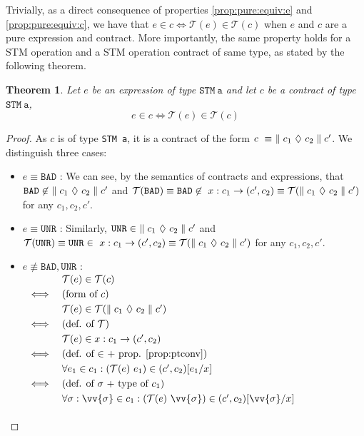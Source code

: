 \documentclass[submission,copyright,creativecommons]{eptcs}
\newcommand{\pt}{\ensuremath{\mathcal{T}}}
\newtheorem{theorem}{Theorem}
\begin{document}
Trivially, as a direct consequence of properties \eqref{prop:pure:equiv:e} and \eqref{prop:pure:equiv:c}, we have that $e \in c \iff \pt(e) \in \pt(c)$ when $e$ and $c$ are a pure expression and contract. 
More importantly, the same property holds for a STM operation and a STM operation contract of same type, as stated by the following theorem.
\begin{theorem}
Let $e$ be an expression of type $\mathtt{STM \ a}$ and let $c$ be a contract of type $\mathtt{STM \ a}$, 
\[ e \in c \iff \pt(e) \in \pt(c) \]
\end{theorem}
\begin{proof}
As $c$ is of type \texttt{STM a}, it is a contract of the form $c \ \equiv \ \parallel c_1 \ \lozenge \ c_2 \parallel c'$. We distinguish three cases:
\begin{itemize}
\item $e \equiv \mathtt{BAD}$ : 
We can see, by the semantics of contracts and expressions, that $\mathtt{BAD} \not\in \ \contractTM{c_1}{c_2}{c'}$ and $\pt(\mathtt{BAD}) \equiv \mathtt{BAD} \not\in \ x : c_1 -> (c',c_2) \equiv \pt(\contractTM{c_1}{c_2}{c'}) $ for any $c_1,c_2,c'$. 
\item $e \equiv \mathtt{UNR}$ : 
Similarly, $\mathtt{UNR} \in \ \contractTM{c_1}{c_2}{c'}$ and $\pt(\mathtt{UNR}) \equiv \mathtt{UNR} \in \ x : c_1 -> (c',c_2) \equiv \pt(\contractTM{c_1}{c_2}{c'}) $ for any $c_1,c_2,c'$. 
\item $e \not\equiv \mathtt{BAD},\mathtt{UNR}$ : \medskip\\
  \begin{math}
    \begin{array}{ll}
      & \pt(e) \in \pt(c) \smallskip \\
      \iff & \mbox{(form of $c$)}\smallskip\\
      & \pt(e) \in \pt(\contractTM{c_1}{c_2}{c'})\smallskip \\
      \iff & \mbox{(def. of $\pt$)} \smallskip\\
      & \pt(e) \in x : c_1 -> (c',c_2) \smallskip\\
      \iff & \mbox{(def. of $\in$ + prop. \eqref{prop:ptconv})} \smallskip\\
      & \forall e_1 \in c_1 : (\pt(e) \ e_1) \in (c',c_2)[e_1/x] \smallskip\\ 
      \iff & \mbox{(def. of $\sigma$ + type of $c_1$)} \smallskip\\
      & \forall \sigma : \vv{\sigma} \in c_1 : (\pt(e) \ \vv{\sigma}) \in (c',c_2)[\vv{\sigma}/x]\smallskip \\

\end{array}
\end{math}
\end{itemize}
\end{proof}
\end{document}
